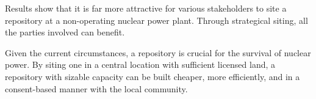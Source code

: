 \begin{table}[h]

\centering
\caption {Metrics and Weight for Each Stakeholder}
\label{tab:stakeholders}
\end{table}

Results show that it is far more attractive for various stakeholders to 
site a repository at a non-operating nuclear power plant. Through strategical
siting, all the parties involved can benefit.

Given the current circumstances, a repository is crucial for the survival of nuclear
power. By siting one in a central location with sufficient licensed land,
a repository with sizable capacity can be built cheaper, more efficiently, and 
in a consent-based manner with the local community. 
